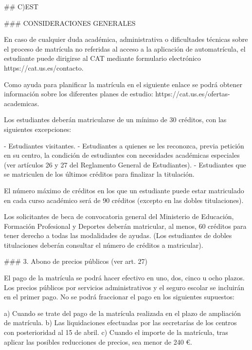 \documentclass{article}
\begin{document}
\begin{itemize}
\begin{itemize}
\begin{scriptsize}
                  \#\# C)EST

                  \#\#\# CONSIDERACIONES GENERALES

                  En caso de cualquier duda académica, administrativa o dificultades técnicas sobre el proceso de matrícula no referidas al acceso a la aplicación de automatrícula, el estudiante puede dirigirse al CAT mediante formulario electrónico https://cat.us.es/contacto.

                  Como ayuda para planificar la matrícula en el siguiente enlace se podrá obtener información sobre los diferentes planes de estudio: https://cat.us.es/ofertas-academicas.

                  Los estudiantes deberán matricularse de un mínimo de 30 créditos, con las siguientes excepciones:

                  - Estudiantes visitantes.
                  - Estudiantes a quienes se les reconozca, previa petición en su centro, la condición de estudiantes con necesidades académicas especiales (ver artículos 26 y 27 del Reglamento General de Estudiantes).
                  - Estudiantes que se matriculen de los últimos créditos para finalizar la titulación.

                  El número máximo de créditos en los que un estudiante puede estar matriculado en cada curso académico será de 90 créditos (excepto en las dobles titulaciones).

                  Los solicitantes de beca de convocatoria general del Ministerio de Educación, Formación Profesional y Deportes deberán matricular, al menos, 60 créditos para tener derecho a todas las modalidades de ayudas. (Los estudiantes de dobles titulaciones deberán consultar el número de créditos a matricular).

                  \#\#\# 3. Abono de precios públicos (ver art. 27)

                  El pago de la matrícula se podrá hacer efectivo en uno, dos, cinco u ocho plazos. Los precios públicos por servicios administrativos y el seguro escolar se incluirán en el primer pago. No se podrá fraccionar el pago en los siguientes supuestos:

                  a) Cuando se trate del pago de la matrícula realizada en el plazo de ampliación de matrícula.
                  b) Las liquidaciones efectuadas por las secretarías de los centros con posterioridad al 15 de abril.
                  c) Cuando el importe de la matrícula, tras aplicar las posibles reducciones de precios, sea menor de 240 €.


\end{scriptsize}
\end{itemize}
\end{itemize}
\end{document}
